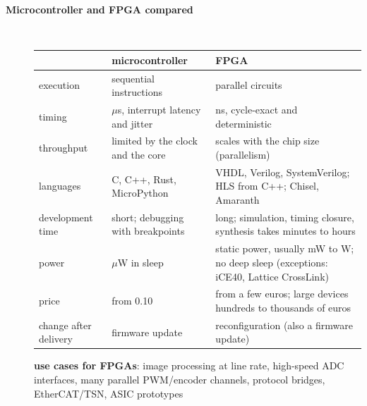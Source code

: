 \begin{description}
\item[{\rot\bf Microcontroller and FPGA compared}]~\\[-\lblskip]
\begin{center}
{\footnotesize
\begin{tabularx}{\linewidth}{|l|L|L|}
\hline
 & \textbf{microcontroller} & \textbf{FPGA} \\
\hline
execution & sequential instructions & parallel circuits \\
timing & $\mu$s, interrupt latency and jitter & ns, cycle-exact and deterministic \\
throughput & limited by the clock and the core & scales with the chip size (parallelism) \\
languages & C, C++, Rust, MicroPython & VHDL, Verilog, SystemVerilog; HLS from C++; Chisel, Amaranth \\
development time & short; debugging with breakpoints & long; simulation, timing closure, synthesis takes minutes to hours \\
power & $\mu$W in sleep & static power, usually mW to W; no deep sleep (exceptions: iCE40, Lattice CrossLink) \\
price & from 0.10\,\texteuro{} & from a few euros; large devices hundreds to thousands of euros \\
change after delivery & firmware update & reconfiguration (also a firmware update) \\
\hline
\end{tabularx}}
\end{center}
\bi
	\ite \textbf{use cases for FPGAs}: image processing at line rate, high-speed ADC interfaces, many parallel PWM/encoder channels, protocol bridges, EtherCAT/TSN, ASIC prototypes
\ei
{}
\os{\newpage}


\end{description}

